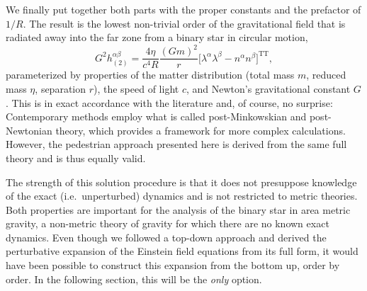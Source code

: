 We finally put together both parts with the proper constants and the prefactor of $1/R$. The result is the lowest non-trivial order of the gravitational field that is radiated away into the far zone from a binary star in circular motion,
\begin{equation}\label{metric_radiation}
  G^2h^{\alpha\beta}_{(2)} = \frac{4\eta}{c^4 R} \frac{(Gm)^2}{r}\lbrack\lambda^\alpha\lambda^\beta - n^\alpha n^\beta\rbrack^\text{TT},
\end{equation}
parameterized by properties of the matter distribution (total mass $m$, reduced mass $\eta$, separation $r$), the speed of light $c$, and Newton's gravitational constant $G$. This is in exact accordance with the literature\cite{poisson} and, of course, no surprise: Contemporary methods employ what is called post-Minkowskian and post-Newtonian theory\cite{poisson}, which provides a framework for more complex calculations. However, the pedestrian approach presented here is derived from the same full theory and is thus equally valid.

The strength of this solution procedure is that it does not presuppose knowledge of the exact (i.e.~unperturbed) dynamics and is not restricted to metric theories. Both properties are important for the analysis of the binary star in area metric gravity, a non-metric theory of gravity for which there are no known exact dynamics. Even though we followed a top-down approach and derived the perturbative expansion of the Einstein field equations from its full form, it would have been possible to construct this expansion from the bottom up, order by order. In the following section, this will be the \emph{only} option.

